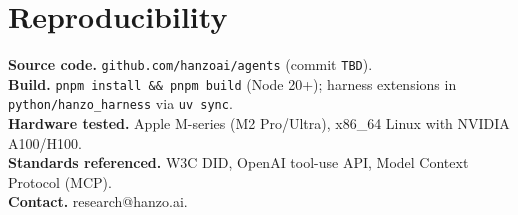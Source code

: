 \documentclass[11pt]{article}
\begin{document}
\section*{Reproducibility}
\textbf{Source code.} \texttt{github.com/hanzoai/agents} (commit \texttt{TBD}).\\
\textbf{Build.} \texttt{pnpm install \&\& pnpm build} (Node 20+); harness extensions in \texttt{python/hanzo\_harness} via \texttt{uv sync}.\\
\textbf{Hardware tested.} Apple M-series (M2 Pro/Ultra), x86\_64 Linux with NVIDIA A100/H100.\\
\textbf{Standards referenced.} W3C DID, OpenAI tool-use API, Model Context Protocol (MCP).\\
\textbf{Contact.} research@hanzo.ai.
\end{document}
